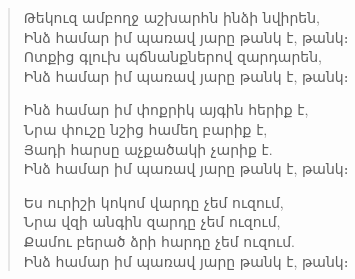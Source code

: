 \begin{titlepage}

\null\vfill

\begin{verse}
\sffamily\small
Թեկուզ ամբողջ աշխարհն ինձի նվիրեն, \\
Ինձ համար իմ պառավ յարը թանկ է, թանկ։ \\
Ոտքից գլուխ պճնանքներով զարդարեն, \\
Ինձ համար իմ պառավ յարը թանկ է, թանկ։

Ինձ համար իմ փոքրիկ այգին հերիք է, \\
Նրա փուշը նշից համեղ բարիք է, \\
Յադի հարսը աչքածակի չարիք է. \\
Ինձ համար իմ պառավ յարը թանկ է, թանկ։

Ես ուրիշի կոկոմ վարդը չեմ ուզում, \\
Նրա վզի անգին զարդը չեմ ուզում, \\
Քամու բերած ձրի հարդը չեմ ուզում. \\
Ինձ համար իմ պառավ յարը թանկ է, թանկ։

\end{verse}



\vfill\null

\end{titlepage}
